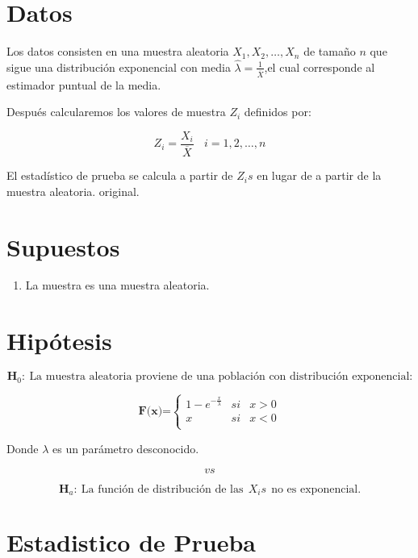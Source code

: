 \documentclass[
  a4paper,
  oneside,
  openany]{book}
\providecommand{\tightlist}{%
  \setlength{\itemsep}{0pt}\setlength{\parskip}{0pt}}
\begin{document}
\hypertarget{datos-17}{%
\section{Datos}\label{datos-17}}

Los datos consisten en una muestra aleatoria \(X_{1},X_{2},\ldots,X_{n}\) de tamaño \(n\) que sigue una distribución exponencial con media \(\hat{\lambda} = \frac{1}{\overline{X}}\),el cual corresponde al estimador puntual de la media.

Después calcularemos los valores de muestra \(Z_{i}\) definidos por:

\[Z_{i}=\frac{X_{i}}{\overline{X}} \ \ \ \ i=1,2,\ldots,n\]

El estadístico de prueba se calcula a partir de \(Z_{i}s\) en lugar de a partir de la muestra aleatoria. original.

\hypertarget{supuestos-15}{%
\section{Supuestos}\label{supuestos-15}}

\begin{enumerate}
\def\labelenumi{\arabic{enumi})}
\tightlist
\item
  La muestra es una muestra aleatoria.
\end{enumerate}

\hypertarget{hipuxf3tesis-17}{%
\section{Hipótesis}\label{hipuxf3tesis-17}}

\[\textbf{H}_0: \ \mbox{La muestra aleatoria proviene de una población con distribución exponencial:}\]

\[
\textbf{F(x)=} \left\{
\begin{array}{lcc}
1-e^{-\frac{x}{\lambda}} & si & x > 0 \\
x & si &  x < 0 \\
\end{array}
\right.
\]

Donde \(\lambda\) es un parámetro desconocido.

\[vs\]

\[\textbf{H}_a: \ \mbox{La función de distribución de las} \ \  X_{i}s \ \  \mbox{no es exponencial.}\]

\hypertarget{estadistico-de-prueba}{%
\section{Estadistico de Prueba}\label{estadistico-de-prueba}}
\end{document}
